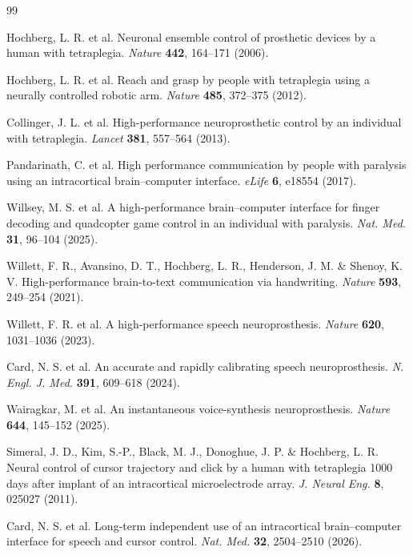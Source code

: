 \begin{thebibliography}{99}

 Hochberg, L. R. et al. Neuronal ensemble control of prosthetic devices by a human with tetraplegia. \textit{Nature} \textbf{442}, 164--171 (2006).

 Hochberg, L. R. et al. Reach and grasp by people with tetraplegia using a neurally controlled robotic arm. \textit{Nature} \textbf{485}, 372--375 (2012).

 Collinger, J. L. et al. High-performance neuroprosthetic control by an individual with tetraplegia. \textit{Lancet} \textbf{381}, 557--564 (2013).

 Pandarinath, C. et al. High performance communication by people with paralysis using an intracortical brain--computer interface. \textit{eLife} \textbf{6}, e18554 (2017).

 Willsey, M. S. et al. A high-performance brain--computer interface for finger decoding and quadcopter game control in an individual with paralysis. \textit{Nat. Med.} \textbf{31}, 96--104 (2025).

 Willett, F. R., Avansino, D. T., Hochberg, L. R., Henderson, J. M. \& Shenoy, K. V. High-performance brain-to-text communication via handwriting. \textit{Nature} \textbf{593}, 249--254 (2021).

 Willett, F. R. et al. A high-performance speech neuroprosthesis. \textit{Nature} \textbf{620}, 1031--1036 (2023).

 Card, N. S. et al. An accurate and rapidly calibrating speech neuroprosthesis. \textit{N. Engl. J. Med.} \textbf{391}, 609--618 (2024).

 Wairagkar, M. et al. An instantaneous voice-synthesis neuroprosthesis. \textit{Nature} \textbf{644}, 145--152 (2025).

 Simeral, J. D., Kim, S.-P., Black, M. J., Donoghue, J. P. \& Hochberg, L. R. Neural control of cursor trajectory and click by a human with tetraplegia 1000 days after implant of an intracortical microelectrode array. \textit{J. Neural Eng.} \textbf{8}, 025027 (2011).

 Card, N. S. et al. Long-term independent use of an intracortical brain--computer interface for speech and cursor control. \textit{Nat. Med.} \textbf{32}, 2504--2510 (2026).


\end{thebibliography}
